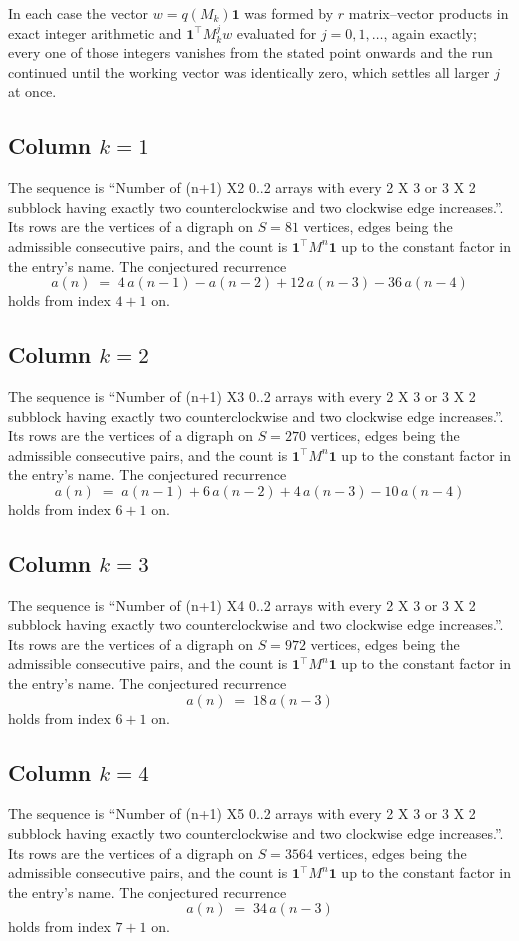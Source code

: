\documentclass[11pt,a4paper]{article}
\theoremstyle{plain}
\theoremstyle{definition}
\begin{document}
In each case the vector $w=q(M_k)\mathbf{1}$ was formed by $r$ matrix--vector products in
exact integer arithmetic and $\mathbf{1}^{\!\top}M_k^{j}w$ evaluated for $j=0,1,\dots$,
again exactly; every one of those integers vanishes from the stated point onwards and the run
continued until the working vector was identically zero, which settles all larger $j$ at once.

\subsection*{Column $k$$=1$}
The sequence is ``Number of (n+1) X2 0..2 arrays with every 2 X 3 or 3 X 2 subblock having exactly two counterclockwise and two clockwise edge increases.''. Its rows are the vertices of a digraph on
$S=81$ vertices, edges being the admissible consecutive pairs, and the count is
$\mathbf{1}^{\!\top}M^{n}\mathbf{1}$ up to the constant factor in the entry's name.
The conjectured recurrence
\[
a(n)\;=\;4\,a(n-1) - a(n-2) + 12\,a(n-3) - 36\,a(n-4)
\]
holds from index $4+1$ on.

\subsection*{Column $k$$=2$}
The sequence is ``Number of (n+1) X3 0..2 arrays with every 2 X 3 or 3 X 2 subblock having exactly two counterclockwise and two clockwise edge increases.''. Its rows are the vertices of a digraph on
$S=270$ vertices, edges being the admissible consecutive pairs, and the count is
$\mathbf{1}^{\!\top}M^{n}\mathbf{1}$ up to the constant factor in the entry's name.
The conjectured recurrence
\[
a(n)\;=\;a(n-1) + 6\,a(n-2) + 4\,a(n-3) - 10\,a(n-4)
\]
holds from index $6+1$ on.

\subsection*{Column $k$$=3$}
The sequence is ``Number of (n+1) X4 0..2 arrays with every 2 X 3 or 3 X 2 subblock having exactly two counterclockwise and two clockwise edge increases.''. Its rows are the vertices of a digraph on
$S=972$ vertices, edges being the admissible consecutive pairs, and the count is
$\mathbf{1}^{\!\top}M^{n}\mathbf{1}$ up to the constant factor in the entry's name.
The conjectured recurrence
\[
a(n)\;=\;18\,a(n-3)
\]
holds from index $6+1$ on.

\subsection*{Column $k$$=4$}
The sequence is ``Number of (n+1) X5 0..2 arrays with every 2 X 3 or 3 X 2 subblock having exactly two counterclockwise and two clockwise edge increases.''. Its rows are the vertices of a digraph on
$S=3564$ vertices, edges being the admissible consecutive pairs, and the count is
$\mathbf{1}^{\!\top}M^{n}\mathbf{1}$ up to the constant factor in the entry's name.
The conjectured recurrence
\[
a(n)\;=\;34\,a(n-3)
\]
holds from index $7+1$ on.
\end{document}
